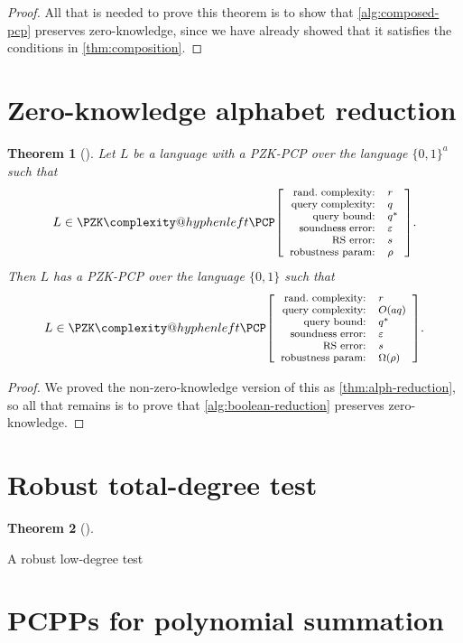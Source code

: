 \documentclass[english,12pt]{reedthesis}
\makeatletter
\theoremstyle{plain}
\newtheorem{thm}{Theorem}[section]
\theoremstyle{definition}
\theoremstyle{remark}
\newcommand{\pzkpcpr}[6]{%
  \ensuremath%
  \mleft[{\footnotesize\begin{array}{r l}
    \text{rand.\ complexity:} & #1 \\
    \text{query complexity:} & #2 \\
    \text{query bound:} & #3 \\
    \text{soundness error:} & #4 \\
    \text{RS error:} & #5 \\
    \text{robustness param:} & #6
  \end{array}}\mright]%
}
\newcommand{\PZKPCP}{%
  \PZK\complexity@hyphenleft\PCP
}
\makeatother
\begin{document}
\begin{proof}
  All that is needed to prove this theorem is to show that
  \cref{alg:composed-pcp} preserves zero-knowledge, since we have already showed
  that it satisfies the conditions in \cref{thm:composition}.
\end{proof}

\section{Zero-knowledge alphabet reduction}\label{sec:zk-alph-red}

\begin{thm}[{\cite[Lemma 2.13]{BGHSV06}}]%
  \label{thm:zk-alph-red}\label{alphabet reduction!zero-knowledge}
  Let $L$ be a language with a PZK-PCP over the language $\{0, 1\}^{a}$ such
  that
  \[
    L \in \PZKPCP\pzkpcpr{r}{q}{q^{*}}{\varepsilon}{s}{\rho}.
  \]
  Then $L$ has a PZK-PCP over the language $\{0, 1\}$ such that
  \[
    L \in \PZKPCP\pzkpcpr{r}{O(aq)}{q^{*}}{\varepsilon}{s}{\Omega(\rho)}.
  \]
\end{thm}

\begin{proof}
  We proved the non-zero-knowledge version of this as \cref{thm:alph-reduction},
  so all that remains is to prove that \cref{alg:boolean-reduction} preserves
  zero-knowledge.
\end{proof}

\section{Robust total-degree test}\label{sec:robust-degree}

\begin{thm}[{\cite[Prop.\ 5.7]{Par21}}]\label{thm:robust-low-deg}
\end{thm}

\begin{algorithm}[htbp]
  \caption{A robust low-degree test~\cite[Prop.\ 5.7]{Par21}}\label{alg:robust-low-deg}
\end{algorithm}

\section{PCPPs for polynomial summation}\label{sec:pcpp-poly-sum}
\end{document}
